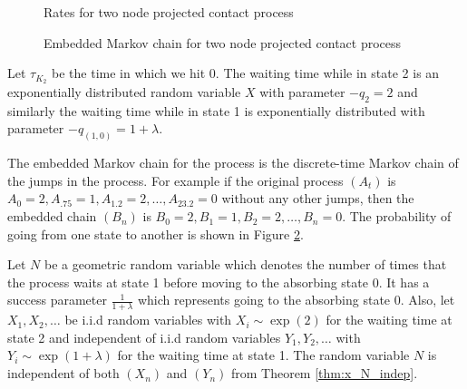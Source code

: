 \begin{figure}[H]
    \centering
    \caption{Rates for two node projected contact process}
    \label{fig:rates_mc_two_contact}
\end{figure}

\begin{figure}[H]
    \centering
    \caption{Embedded Markov chain for two node projected contact process}
    \label{fig:discrete_mc_two_contact}
\end{figure}

Let $\tau_{K_2}$ be the time in which we hit 0.
The waiting time while in state 2 is an exponentially distributed random variable $X$ with parameter $- q_{2} = 2$ and similarly the waiting time while in state 1 is exponentially distributed with parameter $- q_{(1,0)} = 1 + \lambda$.

The embedded Markov chain for the process is the discrete-time Markov chain of the jumps in the process.
For example if the original process $(A_t)$ is $A_{0} = 2, A_{.75} = 1, A_{1.2} = 2, \ldots, A_{23.2} = 0$ without any other jumps, then the embedded chain $(B_n)$ is $B_{0} = 2, B_1 = 1, B_2 = 2, \ldots, B_n = 0$.
The probability of going from one state to another is shown in Figure \ref{fig:discrete_mc_two_contact}.

Let $N$ be a geometric random variable which denotes the number of times that the process waits at state 1 before moving to the absorbing state 0.
It has a success parameter $\frac{1}{1 + \lambda}$ which represents going to the absorbing state 0.
Also, let $X_1, X_2, \ldots$ be i.i.d random variables with
$X_i \sim \exp(2)$ for the waiting time at state 2 and independent of i.i.d random variables $Y_1, Y_2, \ldots$ with  $Y_i \sim \exp(1 + \lambda)$ for the waiting time at state 1.
The random variable $N$ is independent of both $(X_n)$ and $(Y_n)$ from Theorem \ref{thm:x_N_indep}.

